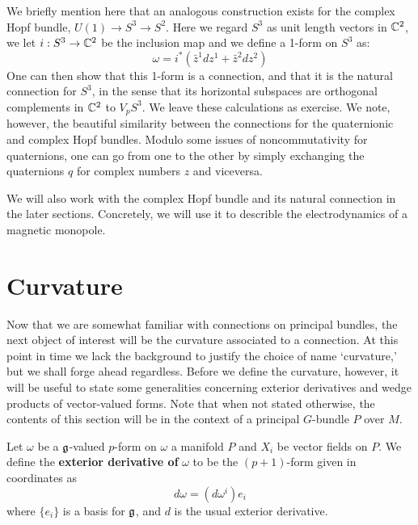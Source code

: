 We briefly mention here that an analogous construction exists for the complex Hopf bundle, $U(1) \to S^3 \to S^2$. Here we regard $S^3$ as unit length vectors in $\mathbb{C}^2$, we let $i:S^3 \to \mathbb{C}^2$ be the inclusion map and we define a 1-form on $S^3$ as:
\[       \omega = i^* (\bar z^1 dz^1 + \bar z^2 dz^2)       \]
One can then show that this 1-form is a connection, and that it is the natural connection for $S^3$, in the sense that its horizontal subspaces are orthogonal complements in $\mathbb{C}^2$ to $V_p S^3$. We leave these calculations as exercise. We note, however, the beautiful similarity between the connections for the quaternionic and complex Hopf bundles. Modulo some issues of noncommutativity for quaternions, one can go from one to the other by simply exchanging the quaternions $q$ for complex numbers $z$ and viceversa.

We will also work with the complex Hopf bundle and its natural connection in the later sections. Concretely, we will use it to describle the electrodynamics of a magnetic monopole.


















\section{Curvature}

Now that we are somewhat familiar with connections on principal bundles, the next object
of interest will be the curvature associated to a connection. At this point in time we lack
the background to justify the choice of name `curvature,' but we shall forge ahead regardless. 
Before we define the curvature, however, it will be useful to state some generalities concerning
exterior derivatives and wedge products of vector-valued forms. Note that when not stated otherwise,
the contents of this section will be in the context of a principal $G$-bundle $P$ over $M$.

\begin{defn}
Let $\omega$ be a $\mathfrak g$-valued $p$-form on $\omega$ a manifold $P$ and $X_i$ be vector fields on $P$.
We define the \textbf{exterior derivative of} $\omega$ to be the $(p+1)$-form given in coordinates as
\[d\omega = (d\omega^i)e_i\]
where $\{e_i\}$ is a basis for $\mathfrak g$, and $d$ is the usual exterior derivative.
\end{defn}

